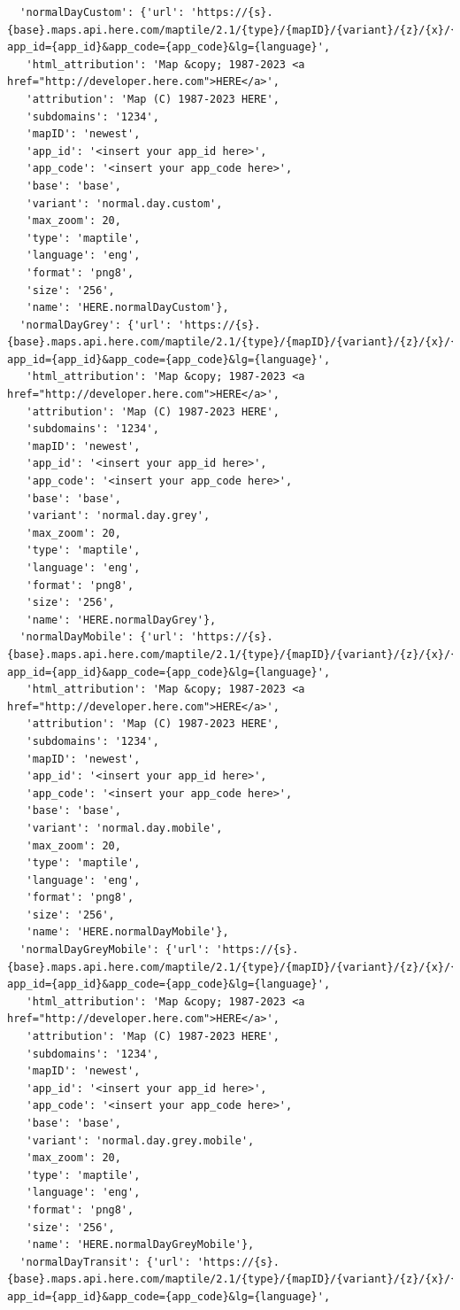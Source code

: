 \documentclass[
  letterpaper,
  DIV=11,
  numbers=noendperiod]{scrreprt}
\begin{document}
\begin{verbatim}
  'normalDayCustom': {'url': 'https://{s}.{base}.maps.api.here.com/maptile/2.1/{type}/{mapID}/{variant}/{z}/{x}/{y}/{size}/{format}?app_id={app_id}&app_code={app_code}&lg={language}',
   'html_attribution': 'Map &copy; 1987-2023 <a href="http://developer.here.com">HERE</a>',
   'attribution': 'Map (C) 1987-2023 HERE',
   'subdomains': '1234',
   'mapID': 'newest',
   'app_id': '<insert your app_id here>',
   'app_code': '<insert your app_code here>',
   'base': 'base',
   'variant': 'normal.day.custom',
   'max_zoom': 20,
   'type': 'maptile',
   'language': 'eng',
   'format': 'png8',
   'size': '256',
   'name': 'HERE.normalDayCustom'},
  'normalDayGrey': {'url': 'https://{s}.{base}.maps.api.here.com/maptile/2.1/{type}/{mapID}/{variant}/{z}/{x}/{y}/{size}/{format}?app_id={app_id}&app_code={app_code}&lg={language}',
   'html_attribution': 'Map &copy; 1987-2023 <a href="http://developer.here.com">HERE</a>',
   'attribution': 'Map (C) 1987-2023 HERE',
   'subdomains': '1234',
   'mapID': 'newest',
   'app_id': '<insert your app_id here>',
   'app_code': '<insert your app_code here>',
   'base': 'base',
   'variant': 'normal.day.grey',
   'max_zoom': 20,
   'type': 'maptile',
   'language': 'eng',
   'format': 'png8',
   'size': '256',
   'name': 'HERE.normalDayGrey'},
  'normalDayMobile': {'url': 'https://{s}.{base}.maps.api.here.com/maptile/2.1/{type}/{mapID}/{variant}/{z}/{x}/{y}/{size}/{format}?app_id={app_id}&app_code={app_code}&lg={language}',
   'html_attribution': 'Map &copy; 1987-2023 <a href="http://developer.here.com">HERE</a>',
   'attribution': 'Map (C) 1987-2023 HERE',
   'subdomains': '1234',
   'mapID': 'newest',
   'app_id': '<insert your app_id here>',
   'app_code': '<insert your app_code here>',
   'base': 'base',
   'variant': 'normal.day.mobile',
   'max_zoom': 20,
   'type': 'maptile',
   'language': 'eng',
   'format': 'png8',
   'size': '256',
   'name': 'HERE.normalDayMobile'},
  'normalDayGreyMobile': {'url': 'https://{s}.{base}.maps.api.here.com/maptile/2.1/{type}/{mapID}/{variant}/{z}/{x}/{y}/{size}/{format}?app_id={app_id}&app_code={app_code}&lg={language}',
   'html_attribution': 'Map &copy; 1987-2023 <a href="http://developer.here.com">HERE</a>',
   'attribution': 'Map (C) 1987-2023 HERE',
   'subdomains': '1234',
   'mapID': 'newest',
   'app_id': '<insert your app_id here>',
   'app_code': '<insert your app_code here>',
   'base': 'base',
   'variant': 'normal.day.grey.mobile',
   'max_zoom': 20,
   'type': 'maptile',
   'language': 'eng',
   'format': 'png8',
   'size': '256',
   'name': 'HERE.normalDayGreyMobile'},
  'normalDayTransit': {'url': 'https://{s}.{base}.maps.api.here.com/maptile/2.1/{type}/{mapID}/{variant}/{z}/{x}/{y}/{size}/{format}?app_id={app_id}&app_code={app_code}&lg={language}',

\end{verbatim}
\end{document}
